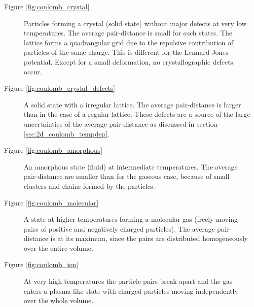 \documentclass[11pt, a4paper]{article}
\numberwithin{equation}{section}
\begin{document}
\begin{description}
	\item[Figure \ref{fig:coulomb_crystal}]
		Particles forming a crystal (solid state) without major defects at very low temperatures.
		The average pair-distance is small for such states.
		The lattice forms a quadrangular grid due to the repulsive contribution of particles of the same charge.
		This is different for the Lennard-Jones potential.
		Except for a small deformation, no crystallographic defects occur.
	
	\item[Figure \ref{fig:coulomb_crystal_defects}]
		A solid state with a irregular lattice.
		The average pair-distance is larger than in the case of a regular lattice.
		These defects are a source of the large uncertainties of the average pair-distance as discussed in section \ref{sec:2d_coulomb_tempdep}.
	
	\item[Figure \ref{fig:coulomb_amorphous}]
		An amorphous state (fluid) at intermediate temperatures.
		The average pair-distance are smaller than for the gaseous case, because of small clusters and chains formed by the particles.
		
	\item[Figure \ref{fig:coulomb_molecular}] 
		A state at higher temperatures forming a molecular gas (freely moving pairs of positive and negatively charged particles).
		The average pair-distance is at its maximum, since the pairs are distributed homogeneously over the entire volume.
	
	\item[Figure \ref{fig:coulomb_ion}]
		At very high temperatures the particle pairs break apart and the gas enters a plasma-like state with charged particles moving independently over the whole volume.
		
\end{description}
\end{document}
